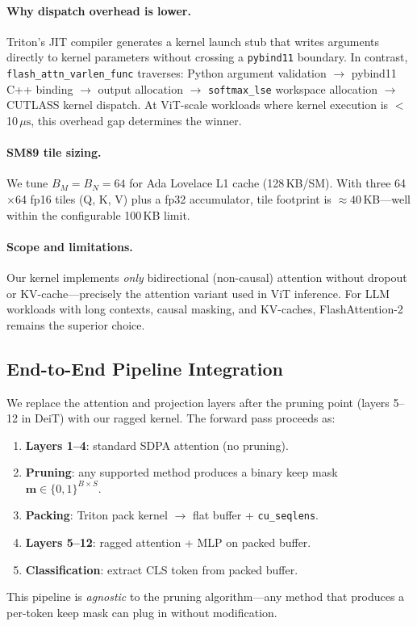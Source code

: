 \documentclass[conference]{IEEEtran}
\newcommand{\us}{\,\mu\text{s}}
\begin{document}
\paragraph{Why dispatch overhead is lower.}
Triton's JIT compiler generates a kernel launch stub that writes
arguments directly to kernel parameters without crossing a
\texttt{pybind11} boundary.
In contrast, \texttt{flash\_attn\_varlen\_func} traverses:
Python argument validation $\to$ pybind11 C++ binding $\to$
output allocation $\to$ \texttt{softmax\_lse} workspace allocation
$\to$ CUTLASS kernel dispatch.
At ViT-scale workloads where kernel execution is $<$10$\us$,
this overhead gap determines the winner.

\paragraph{SM89 tile sizing.}
We tune $B_M{=}B_N{=}64$ for Ada Lovelace L1 cache (128\,KB/SM).
With three 64$\times$64 fp16 tiles (Q, K, V) plus a fp32 accumulator,
tile footprint is ${\approx}40$\,KB---well within the configurable
100\,KB limit.

\paragraph{Scope and limitations.}
Our kernel implements \emph{only} bidirectional (non-causal) attention
without dropout or KV-cache---precisely the attention variant used
in ViT inference.
For LLM workloads with long contexts, causal masking, and KV-caches,
FlashAttention-2 remains the superior choice.

\subsection{End-to-End Pipeline Integration}

We replace the attention and projection layers after the pruning
point (layers 5--12 in DeiT) with our ragged kernel.
The forward pass proceeds as:
\begin{enumerate}[nosep,leftmargin=*]
  \item \textbf{Layers 1--4}: standard SDPA attention (no pruning).
  \item \textbf{Pruning}: any supported method produces a binary
    keep mask $\mathbf{m} \in \{0,1\}^{B \times S}$.
  \item \textbf{Packing}: Triton pack kernel $\to$ flat buffer +
    \texttt{cu\_seqlens}.
  \item \textbf{Layers 5--12}: ragged attention + MLP on packed buffer.
  \item \textbf{Classification}: extract CLS token from packed buffer.
\end{enumerate}
This pipeline is \emph{agnostic} to the pruning algorithm---any method
that produces a per-token keep mask can plug in without modification.
\end{document}
